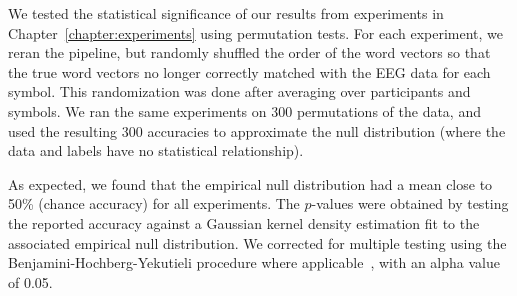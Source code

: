 We tested the statistical significance of our results from experiments in 
Chapter~\ref{chapter:experiments} using permutation tests. For each experiment, 
we reran the pipeline, but randomly shuffled the order of the word vectors so 
that the true word vectors no longer correctly matched with the EEG data for 
each symbol. This randomization was done after averaging over participants and 
symbols. We ran the same experiments on 300 permutations of the data, and used 
the resulting 300 \tvt accuracies to approximate the null distribution (where 
the data and labels have no statistical relationship). 
  
As expected, we found that the empirical null distribution had a mean close to 
50\% (chance accuracy) for all experiments. The $p$-values were obtained by 
testing the reported accuracy against a Gaussian kernel density estimation fit 
to the associated empirical null distribution. We corrected for multiple 
testing using the Benjamini-Hochberg-Yekutieli procedure where 
applicable~\cite{benjamini2001control}, with an alpha value of 0.05.
